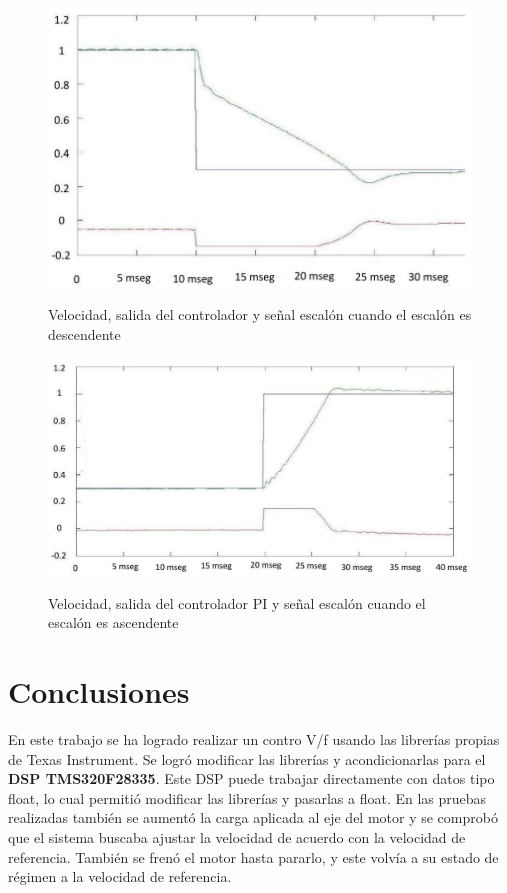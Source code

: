 \documentclass[conference]{IEEEtran}
\begin{document}
\begin{figure}[!t]
\centering
\includegraphics[width=8 cm]{figuras/figura_22.jpeg} \\
\caption{Velocidad, salida del controlador y señal escalón cuando el escalón es descendente} 
\label{fig_salPI_des}
\end{figure}


\begin{figure}[!t]
\centering
\includegraphics[width=8 cm]{figuras/figura_23.jpeg} \\
\caption{Velocidad, salida del controlador PI y señal escalón cuando el escalón es ascendente} 
\label{fig_salPI_asc}
\end{figure}

\section{Conclusiones}

En este trabajo se ha logrado realizar un contro V/f usando las librerías propias de Texas Instrument. Se logró modificar las librerías y acondicionarlas para el \textbf{DSP TMS320F28335}. Este DSP puede trabajar directamente con datos tipo float, lo cual permitió modificar las librerías y pasarlas a float.
En las pruebas realizadas también se aumentó la carga aplicada al eje del motor y se comprobó que el sistema buscaba ajustar la velocidad de acuerdo con la velocidad de referencia.
También se frenó el motor hasta pararlo, y este volvía a su estado de régimen a la velocidad de referencia.


\end{document}
